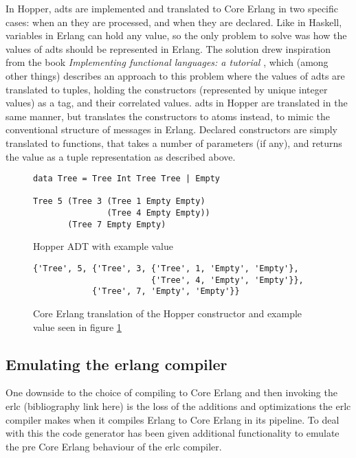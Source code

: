 In Hopper, \glspl{adt} are implemented and translated to Core Erlang in two specific cases: when an
they are processed, and when they are declared. Like in Haskell, variables in Erlang can
hold any value, so the only problem to solve was how the values of \glspl{adt} should be represented in
Erlang. The solution drew inspiration from the book \textit{Implementing functional languages: a tutorial} \cite{FunTutorial},
which (among other things) describes an approach to this problem where the values of \glspl{adt} are translated to tuples,
holding the constructors (represented by unique integer values) as a tag, and their correlated values.%
\glspl{adt} in Hopper are translated in the same manner, but translates the constructors to atoms instead,
to mimic the conventional structure of messages in Erlang.%
Declared constructors are simply translated to functions, that takes a number of parameters (if any), and
returns the value as a tuple representation as described above.%


\begin{figure}[!htb]
\centering
\begin{lstlisting} 
data Tree = Tree Int Tree Tree | Empty

Tree 5 (Tree 3 (Tree 1 Empty Empty) 
               (Tree 4 Empty Empty)) 
       (Tree 7 Empty Empty)
\end{lstlisting}
\caption{Hopper ADT with example value}
\label{lst:hopperAdt}
\end{figure}

\begin{figure}[!htb]
\centering
\begin{lstlisting} 
{'Tree', 5, {'Tree', 3, {'Tree', 1, 'Empty', 'Empty'},
                        {'Tree', 4, 'Empty', 'Empty'}},
            {'Tree', 7, 'Empty', 'Empty'}}
\end{lstlisting}
\caption[Core Erlang translation of constructor and example value]
 {Core Erlang translation of the Hopper constructor and example value seen in figure \ref{lst:hopperAdt}}
\label{lst:coreAdt}
\end{figure}


\subsection{Emulating the erlang compiler}

One downside to the choice of compiling to Core Erlang and then invoking the erlc
(bibliography link here) is the loss of the additions and optimizations the erlc
compiler makes when it compiles Erlang to Core Erlang in its pipeline. To deal with this
the code generator has been given additional functionality to emulate the pre Core Erlang
behaviour of the erlc compiler. 